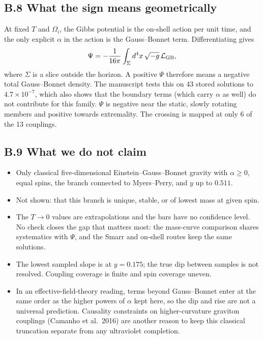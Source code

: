 \documentclass[12pt,a4paper]{article}
\begin{document}
\subsection*{B.8 What the sign means geometrically}

At fixed $T$ and $\Omega_i$, the Gibbs potential is the on-shell action per unit
time, and the only explicit $\alpha$ in the action is the Gauss--Bonnet term.
Differentiating gives
\[
\Psi=-\frac{1}{16\pi}\int_\Sigma d^4x\,\sqrt{-g}\,\mathcal L_{\rm GB},
\]
where $\Sigma$ is a slice outside the horizon. A positive $\Psi$ therefore means a
negative total Gauss--Bonnet density. The manuscript tests this on 43 stored
solutions to $4.7\times10^{-7}$, which also shows that the boundary terms (which
carry $\alpha$ as well) do not contribute for this family. $\Psi$ is negative near
the static, slowly rotating members and positive towards extremality. The crossing
is mapped at only 6 of the 13 couplings.

\subsection*{B.9 What we do not claim}

\begin{itemize}[nosep]
\item Only classical five-dimensional Einstein--Gauss--Bonnet gravity with
$\alpha\ge0$, equal spins, the branch connected to Myers--Perry, and $y$ up to
$0.511$.
\item Not shown: that this branch is unique, stable, or of lowest mass at given spin.
\item The $T\to0$ values are extrapolations and the bars have no confidence level.
No check closes the gap that matters most: the mass-curve comparison shares
systematics with $\Psi$, and the Smarr and on-shell routes keep the same solutions.
\item The lowest sampled slope is at $y=0.175$; the true dip between samples is not
resolved. Coupling coverage is finite and spin coverage uneven.
\item In an effective-field-theory reading, terms beyond Gauss--Bonnet enter at the
same order as the higher powers of $\alpha$ kept here, so the dip and rise are not a
universal prediction. Causality constraints on higher-curvature graviton couplings
(Camanho et al.\ 2016) are another reason to keep this classical truncation separate
from any ultraviolet completion.
\end{itemize}
\end{document}
